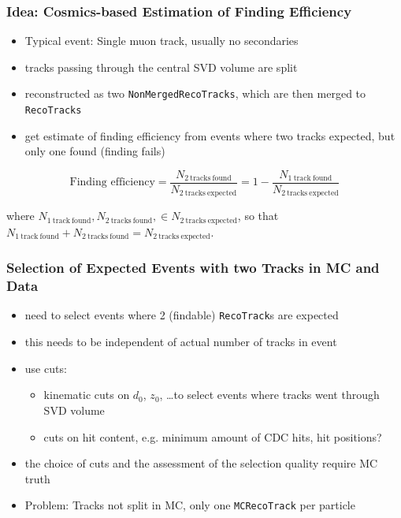 \documentclass[18pt]{beamer}
\begin{document}
  \begin{frame}
    \frametitle{Idea: Cosmics-based Estimation of Finding Efficiency}
    \begin{itemize}
    \item Typical event: Single muon track, usually no secondaries
    \item tracks passing through the central SVD volume are split
    \item reconstructed as two \texttt{NonMergedRecoTracks},
      which are then merged to \texttt{RecoTracks}
    \item get estimate of finding efficiency from events where two tracks expected, but only one found (finding fails)
    \end{itemize}
    \pause
    \begin{block}{}
      \begin{equation*}
        \label{eq:cosmic_eff}
        \text{Finding efficiency} = \frac{N_\mathrm{2\ tracks\ found}}{N_\mathrm{2\ tracks\ expected}}
        = 1 - \frac{N_\mathrm{1\ track\ found}}{N_\mathrm{2\ tracks\ expected}}
      \end{equation*}             %
    \end{block}
    where $N_\mathrm{1\ track\ found}, N_\mathrm{2\ tracks\ found}, \in N_\mathrm{2\ tracks\ expected}$, so that $N_\mathrm{1\ track\ found} + N_\mathrm{2\ tracks\ found} = N_\mathrm{2\ tracks\ expected}$.
    \centering
  \end{frame}

  \begin{frame}
    \frametitle{Selection of Expected Events with two Tracks in MC and Data}
    \begin{itemize}
    \item need to select events where 2 (findable) \texttt{RecoTrack}s are expected
    \item this needs to be independent of actual number of tracks in event
    \item<2-> use cuts:
      \begin{itemize}
      \item kinematic cuts on $d_0$, $z_0$, \ldots to select events where tracks went through SVD volume
      \item cuts on hit content, e.g. minimum amount of CDC hits, hit positions?
      \end{itemize}
    \item<3-> the choice of cuts and the assessment of the selection quality require MC truth
    \item<3-> \textcolor{kit-red100}{Problem:} Tracks not split in MC, only one \texttt{MCRecoTrack} per particle
    \end{itemize}
  \end{frame}
\end{document}
